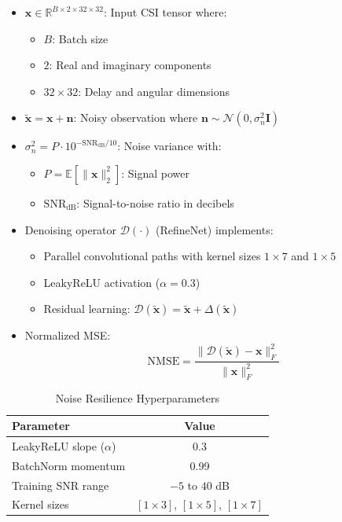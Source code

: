 \documentclass[lettersize,journal]{IEEEtran}
\begin{document}
\begin{itemize}
	\item $\mathbf{x} \in \mathbb{R}^{B \times 2 \times 32 \times 32}$: Input CSI tensor where:
	\begin{itemize}
		\item $B$: Batch size
		\item $2$: Real and imaginary components
		\item $32 \times 32$: Delay and angular dimensions
	\end{itemize}
	
	\item $\tilde{\mathbf{x}} = \mathbf{x} + \mathbf{n}$: Noisy observation where $\mathbf{n} \sim \mathcal{N}(0,\sigma_n^2\mathbf{I})$
	
	\item $\sigma_n^2 = P \cdot 10^{-\text{SNR}_{\text{dB}}/10}$: Noise variance with:
	\begin{itemize}
		\item $P = \mathbb{E}[\|\mathbf{x}\|_2^2]$: Signal power
		\item $\text{SNR}_{\text{dB}}$: Signal-to-noise ratio in decibels
	\end{itemize}
	
	\item Denoising operator $\mathcal{D}(\cdot)$ (RefineNet) implements:
	\begin{itemize}
		\item Parallel convolutional paths with kernel sizes $1\times7$ and $1\times5$
		\item LeakyReLU activation ($\alpha=0.3$)
		\item Residual learning: $\mathcal{D}(\tilde{\mathbf{x}}) = \tilde{\mathbf{x}} + \Delta(\tilde{\mathbf{x}})$
	\end{itemize}
	
	\item Normalized MSE:
	\begin{equation}
		\text{NMSE} = \frac{\|\mathcal{D}(\tilde{\mathbf{x}}) - \mathbf{x}\|_F^2}{\|\mathbf{x}\|_F^2}
	\end{equation}
\end{itemize}

\begin{table}[ht]
	\centering
	\caption{Noise Resilience Hyperparameters}
	\label{tab:noise_params}
	\begin{tabular}{lc}
		\toprule
		Parameter & Value \\
		\midrule
		LeakyReLU slope ($\alpha$) & 0.3 \\
		BatchNorm momentum & 0.99 \\
		Training SNR range & $-5$ to $40$ dB \\
		Kernel sizes & $[1\times3]$, $[1\times5]$, $[1\times7]$ \\
		\bottomrule
	\end{tabular}
\end{table}
\end{document}
